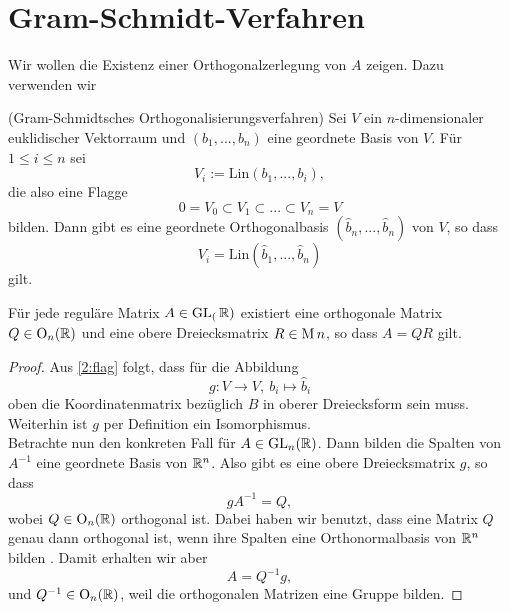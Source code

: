 \section{Gram-Schmidt-Verfahren}
Wir wollen die Existenz einer Orthogonalzerlegung von $A$ zeigen.
\color{purple}
Dazu verwenden wir \cite[11.32]{schroer}
\begin{prop}(Gram-Schmidtsches Orthogonalisierungsverfahren) Sei $V$ ein $n$-dimensionaler euklidischer Vektorraum und $(b_1,...,b_n)$ eine geordnete Basis von $V$. Für $1\leq i\leq n$ sei
  \[
  V_i:= \mathrm{Lin}(b_1,...,b_i),
  \]
  die also eine Flagge
  \[
  0=V_0\subset V_1\subset...\subset V_n = V
  \]
  bilden. Dann gibt es eine geordnete Orthogonalbasis $(\hat{b}_n,...,\hat{b}_n)$ von $V$, so dass
  \begin{equation}\label{2:flag}\tag{$\ast$}
  V_i = \mathrm{Lin}(\hat{b}_1,...,\hat{b}_n)
  \end{equation}
  gilt.
\end{prop}
\begin{thm}
  Für jede reguläre Matrix $A\in\operatorname{GL}_(\mathbb{R})$ existiert eine orthogonale Matrix $Q\in \operatorname{O}_{n}(\mathbb{R})$ und eine obere Dreiecksmatrix $R\in \operatorname{M}{n}$, so dass $A=QR$ gilt.
\end{thm}
\begin{proof}
  Aus \eqref{2:flag} folgt, dass für die Abbildung
  \[
  g:V\to V,~b_i\mapsto \hat{b}_i
  \] oben die Koordinatenmatrix bezüglich $B$ in oberer Dreiecksform sein muss. Weiterhin ist $g$ per Definition ein Isomorphismus.\\
  Betrachte nun den konkreten Fall für $A\in \operatorname{GL}_{n}(\mathbb{R})$. Dann bilden die Spalten von $A^{-1}$ eine geordnete Basis von $\mathbb{R}^n$. Also gibt es eine obere Dreiecksmatrix $g$, so dass
  \[gA^{-1}=Q,\]
  wobei $Q\in \operatorname{O}_{n}(\mathbb{R})$ orthogonal ist. Dabei haben wir benutzt, dass eine Matrix $Q$ genau dann orthogonal ist, wenn ihre Spalten eine Orthonormalbasis von $\mathbb{R}^n$ bilden \cite[11.34]{schroer }. Damit erhalten wir aber
  \[
  A=Q^{-1}g,\]
  und $Q^{-1}\in \operatorname{O}_{n}(\mathbb{R})$, weil die orthogonalen Matrizen eine Gruppe bilden.
\end{proof}
\color{black}

